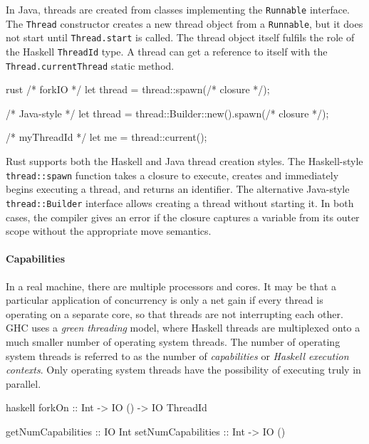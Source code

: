 In Java, threads are created from classes implementing the
\verb|Runnable| interface.  The \verb|Thread| constructor creates a
new thread object from a \verb|Runnable|, but it does not start until
\verb|Thread.start| is called.  The thread object itself fulfils the
role of the Haskell \verb|ThreadId| type.  A thread can get a
reference to itself with the \verb|Thread.currentThread| static
method.

\begin{listing}
\centering
\begin{cminted}{rust}
/* forkIO */
let thread = thread::spawn(/* closure */);

/* Java-style */
let thread = thread::Builder::new().spawn(/* closure */);

/* myThreadId */
let me = thread::current();
\end{cminted}
\caption{Basic threading operations in Rust.}\label{lst:basic_rust}
\end{listing}

Rust supports both the Haskell and Java thread creation styles.  The
Haskell-style \verb|thread::spawn| function takes a closure to
execute, creates and immediately begins executing a thread, and
returns an identifier.  The alternative Java-style
\verb|thread::Builder| interface allows creating a thread without
starting it.  In both cases, the compiler gives an error if the
closure captures a variable from its outer scope without the
appropriate move semantics.

\paragraph{Capabilities}
In a real machine, there are multiple processors and cores.  It may be that a
particular application of concurrency is only a net gain if every thread is
operating on a separate core, so that threads are not interrupting each other.
GHC uses a \emph{green threading} model, where Haskell threads are multiplexed
onto a much smaller number of operating system threads.  The number of operating
system threads is referred to as the number of \emph{capabilities} or
\emph{Haskell execution contexts}.  Only operating system threads have the
possibility of executing truly in parallel.

\pagebreak

\begin{listing}
\centering
\begin{cminted}{haskell}
forkOn             :: Int -> IO () -> IO ThreadId

getNumCapabilities :: IO Int
setNumCapabilities :: Int -> IO ()
\end{cminted}
\caption{Operating system threads in Haskell.}\label{lst:caps_haskell}
\end{listing}

